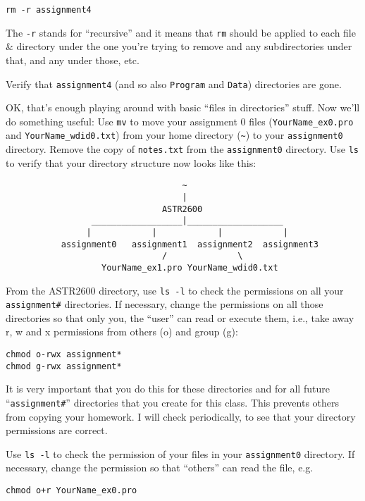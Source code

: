 \documentclass{article}
\begin{document}
\begin{spacing}{1.0}
\verb|rm -r assignment4|

The \verb|-r| stands for “recursive” and it means that \verb|rm| should be applied to each file \& directory under the one you’re trying to remove and any subdirectories under that, and any under those, etc.

Verify that \verb|assignment4|  (and so also \verb|Program| and \verb|Data|) directories are gone.


OK, that’s enough playing around with basic “files in directories” stuff.  Now we’ll do something useful:
Use \verb|mv| to move your assignment 0 files (\verb|YourName_ex0.pro| and \verb|YourName_wdid0.txt|) from your home directory (\verb|~|) to your \verb|assignment0| directory.
Remove the copy of \verb|notes.txt| from the \verb|assignment0| directory. 
Use \verb|ls| to verify that your directory structure now looks like this:

\begin{verbatim}
                                   ~
                                   |
                               ASTR2600
                 __________________|___________________
                |            |            |            |
           assignment0   assignment1  assignment2  assignment3
                               /              \
                   YourName_ex1.pro YourName_wdid0.txt
\end{verbatim}


From the ASTR2600 directory, use \verb|ls -l| to check the permissions on all your \verb|assignment#| directories.
If necessary, change the permissions on all those directories so that only you,
the “user” can read or execute them, i.e., take away r, w and x permissions
from others (o) and group (g):

\begin{verbatim}
chmod o-rwx assignment*
chmod g-rwx assignment*
\end{verbatim}

It is very important that you do this for these directories and for all future
“\verb|assignment#|” directories that you create for this class.  This prevents others
from copying your homework.  I will check periodically, to see that your
directory permissions are correct.

Use \texttt{ls -l} to check the permission of your files in your \texttt{assignment0} directory.
If necessary, change the permission so that “others” can read the file, e.g.

\verb|chmod o+r YourName_ex0.pro|


\end{spacing}
\end{document}
